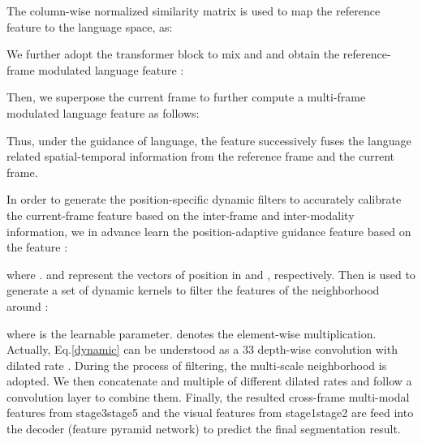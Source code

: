 \documentclass[10pt,twocolumn,letterpaper]{article}
\begin{document}
The column-wise normalized similarity matrix is used to map the reference feature  to the language space, as:

We further adopt the transformer block to mix  and  and obtain the reference-frame modulated language feature :


Then, we superpose the current frame  to further compute a multi-frame modulated language feature  as follows:

Thus, under the guidance of language, the feature  successively fuses the language related spatial-temporal information from the reference frame and the current frame.


In order to generate the position-specific dynamic filters to accurately calibrate the current-frame feature based on the inter-frame and inter-modality information, we in advance learn the position-adaptive guidance feature based on the feature :

where .
 and  represent the vectors of position   in  and , respectively.
Then  is used to generate a set of dynamic kernels to filter the features of the neighborhood around :

where  is the learnable parameter.  denotes the element-wise multiplication. Actually, Eq.\ref{dynamic} can be understood as a 33 depth-wise convolution with dilated rate . During the process of filtering, the multi-scale neighborhood is adopted. We then concatenate  and multiple  of different dilated rates and follow a convolution layer to combine them. Finally, the resulted cross-frame multi-modal features from stage3stage5 and the visual features from stage1stage2 are feed into the decoder (feature pyramid network) to predict the final segmentation result.
\end{document}
